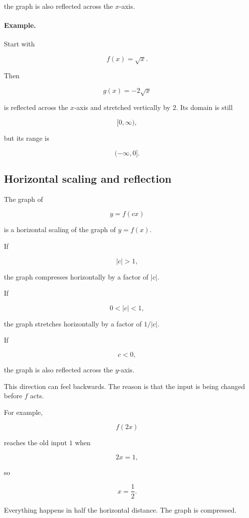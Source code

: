 the graph is also reflected across the \(x\)-axis.

\paragraph{Example.}
Start with

\[
f(x)=\sqrt{x}.
\]

Then

\[
g(x)=-2\sqrt{x}
\]

is reflected across the \(x\)-axis and stretched vertically by \(2\).  Its domain is still

\[
[0,\infty),
\]

but its range is

\[
(-\infty,0].
\]

\subsection{Horizontal scaling and reflection}
\label{appsubsec:horizontal-scaling-reflection}

The graph of

\[
y=f(cx)
\]

is a horizontal scaling of the graph of \(y=f(x)\).

If

\[
|c|>1,
\]

the graph compresses horizontally by a factor of \(|c|\).

If

\[
0<|c|<1,
\]

the graph stretches horizontally by a factor of \(1/|c|\).

If

\[
c<0,
\]

the graph is also reflected across the \(y\)-axis.

This direction can feel backwards.  The reason is that the input is being changed
before \(f\) acts.

For example,

\[
f(2x)
\]

reaches the old input \(1\) when

\[
2x=1,
\]

so

\[
x=\frac12.
\]

Everything happens in half the horizontal distance.  The graph is compressed.

